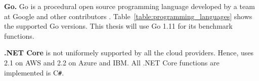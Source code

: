 \textbf{Go.}
Go\cite{GoProject} is a procedural open source programming language developed by a team at Google and other contributors \cite{GoDoc, GoProject}. 
Table~\ref{table:programming_languages} shows the supported Go versions.
  This thesis will use Go 1.11 for its benchmark functions.

\textbf{.NET Core} is not uniformely supported by all the cloud providers. 
Hence, \sys uses 2.1 on \gls{AWS} and 2.2 on Azure and \gls{IBM}.
All .NET Core functions are implemented is C\texttt{\#}.

